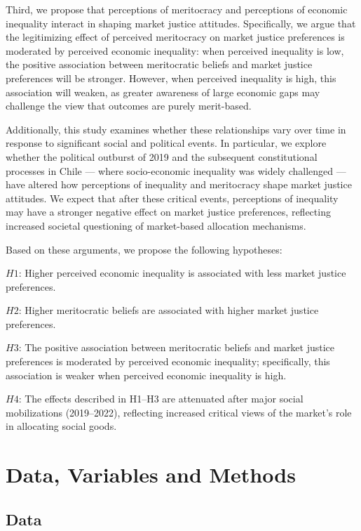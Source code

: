 \documentclass[
  12pt,
]{article}
\begin{document}
Third, we propose that perceptions of meritocracy and perceptions of
economic inequality interact in shaping market justice attitudes.
Specifically, we argue that the legitimizing effect of perceived
meritocracy on market justice preferences is moderated by perceived
economic inequality: when perceived inequality is low, the positive
association between meritocratic beliefs and market justice preferences
will be stronger. However, when perceived inequality is high, this
association will weaken, as greater awareness of large economic gaps may
challenge the view that outcomes are purely merit-based.

Additionally, this study examines whether these relationships vary over
time in response to significant social and political events. In
particular, we explore whether the political outburst of 2019 and the
subsequent constitutional processes in Chile --- where socio-economic
inequality was widely challenged --- have altered how perceptions of
inequality and meritocracy shape market justice attitudes. We expect
that after these critical events, perceptions of inequality may have a
stronger negative effect on market justice preferences, reflecting
increased societal questioning of market-based allocation mechanisms.

Based on these arguments, we propose the following hypotheses:

\(H1\): Higher perceived economic inequality is associated with less
market justice preferences.

\(H2\): Higher meritocratic beliefs are associated with higher market
justice preferences.

\(H3\): The positive association between meritocratic beliefs and market
justice preferences is moderated by perceived economic inequality;
specifically, this association is weaker when perceived economic
inequality is high.

\(H4\): The effects described in H1--H3 are attenuated after major
social mobilizations (2019--2022), reflecting increased critical views
of the market's role in allocating social goods.

\section{Data, Variables and Methods}\label{data-variables-and-methods}

\subsection{Data}\label{data}
\end{document}
